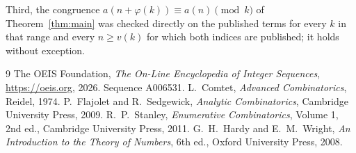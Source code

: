 \documentclass[11pt,a4paper]{article}
\theoremstyle{plain}
\theoremstyle{definition}
\begin{document}
Third, the congruence $a(n+\varphi(k))\equiv a(n)\pmod k$ of Theorem~\ref{thm:main} was
checked directly on the published terms for every $k$ in that range and every $n\ge v(k)$
for which both indices are published; it holds without exception.

\begin{thebibliography}{9}
 The OEIS Foundation, \emph{The On-Line Encyclopedia of Integer
Sequences}, \url{https://oeis.org}, 2026. Sequence A006531.
 L.~Comtet, \emph{Advanced Combinatorics}, Reidel, 1974.
 P.~Flajolet and R.~Sedgewick, \emph{Analytic Combinatorics}, Cambridge
University Press, 2009.
 R.~P.~Stanley, \emph{Enumerative Combinatorics}, Volume 1, 2nd ed.,
Cambridge University Press, 2011.
 G.~H.~Hardy and E.~M.~Wright, \emph{An Introduction to the Theory of
Numbers}, 6th ed., Oxford University Press, 2008.
\end{thebibliography}
\end{document}
